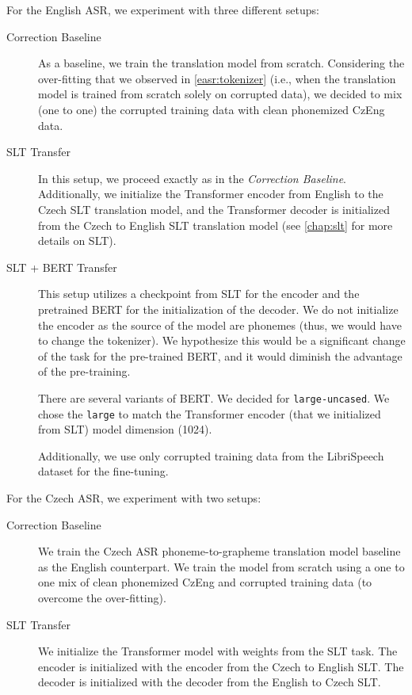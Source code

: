 For the English ASR, we experiment with three different setups:

\begin{description}
	\item[Correction Baseline] As a baseline, we train the translation model from scratch. Considering the over-fitting that we observed in \cref{easr:tokenizer} (i.e., when the translation model is trained from scratch solely on corrupted data), we decided to mix (one to one) the corrupted training data with clean phonemized CzEng data.
	
	\item[SLT Transfer] In this setup, we proceed exactly as in the \emph{Correction Baseline}. Additionally, we initialize the Transformer encoder from English to the Czech SLT translation model, and the Transformer decoder is initialized from the Czech to English SLT translation model (see \cref{chap:slt} for more details on SLT).
	
	\item[SLT + BERT Transfer] This setup utilizes a checkpoint from SLT for the encoder and the pretrained BERT for the initialization of the decoder. We do not initialize the encoder as the source of the model are phonemes (thus, we would have to change the tokenizer). We hypothesize this would be a significant change of the task for the pre-trained BERT, and it would diminish the advantage of the pre-training. 
	
	There are several variants of BERT. We decided for \texttt{large-uncased}. We chose the \texttt{large} to match the Transformer encoder (that we initialized from SLT) model dimension (1024).
	
	Additionally, we use only corrupted training data from the LibriSpeech dataset for the fine-tuning. 
\end{description}

For the Czech ASR, we experiment with two setups:

\begin{description}
	\item[Correction Baseline] We train the Czech ASR phoneme-to-grapheme translation model baseline as the English counterpart. We train the model from scratch using a one to one mix of clean phonemized CzEng and corrupted training data (to overcome the over-fitting).
	
	\item[SLT Transfer] We initialize the Transformer model with weights from the SLT task. The encoder is initialized with the encoder from the Czech to English SLT. The decoder is initialized with the decoder from the English to Czech SLT.
	
\end{description}



